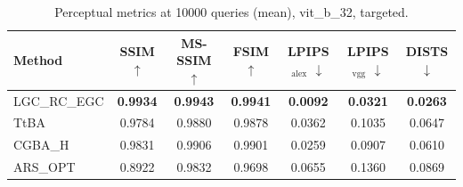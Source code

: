 \begin{table}[t]
\centering\footnotesize
\caption{Perceptual metrics at 10000 queries (mean), vit\_b\_32, targeted.}
\begin{tabular}{lcccccc}
\toprule
Method & SSIM $\uparrow$ & MS-SSIM $\uparrow$ & FSIM $\uparrow$ & LPIPS$_{\mathrm{alex}}$ $\downarrow$ & LPIPS$_{\mathrm{vgg}}$ $\downarrow$ & DISTS $\downarrow$ \\
\midrule
LGC\_RC\_EGC & \textbf{0.9934} & \textbf{0.9943} & \textbf{0.9941} & \textbf{0.0092} & \textbf{0.0321} & \textbf{0.0263} \\
TtBA & 0.9784 & 0.9880 & 0.9878 & 0.0362 & 0.1035 & 0.0647 \\
CGBA\_H & 0.9831 & 0.9906 & 0.9901 & 0.0259 & 0.0907 & 0.0610 \\
ARS\_OPT & 0.8922 & 0.9832 & 0.9698 & 0.0655 & 0.1360 & 0.0869 \\
\bottomrule
\end{tabular}
\end{table}
